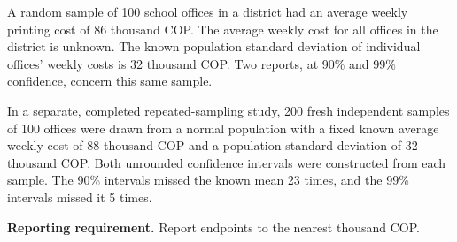 \clearpage
{}
A random sample of 100 school offices in a district had an average weekly printing cost of 86 thousand COP. The average weekly cost for all offices in the district is unknown. The known population standard deviation of individual offices' weekly costs is 32 thousand COP. Two reports, at 90\% and 99\% confidence, concern this same sample.

In a separate, completed repeated-sampling study, 200 fresh independent samples of 100 offices were drawn from a normal population with a fixed known average weekly cost of 88 thousand COP and a population standard deviation of 32 thousand COP. Both unrounded confidence intervals were constructed from each sample. The 90\% intervals missed the known mean 23 times, and the 99\% intervals missed it 5 times.

\textbf{Reporting requirement.} Report endpoints to the nearest thousand COP.




